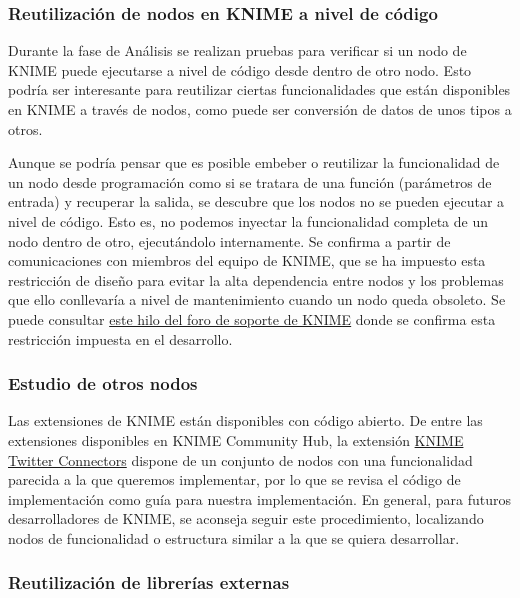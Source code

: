 \subsubsection{Reutilización de nodos en KNIME a nivel de código}

Durante la fase de Análisis se realizan pruebas para verificar si un nodo de KNIME puede ejecutarse a nivel de código desde 
dentro de otro nodo. Esto podría ser interesante para reutilizar ciertas funcionalidades que están disponibles en KNIME 
a través de nodos, como puede ser conversión de datos de unos tipos a otros. 
\

Aunque se podría pensar que es posible embeber o reutilizar la funcionalidad de un nodo desde programación como si 
se tratara de una función (parámetros de entrada) y recuperar la salida, se descubre que los nodos no se pueden ejecutar a nivel de código. Esto es, no podemos inyectar la funcionalidad completa de un nodo 
dentro de otro, ejecutándolo internamente. Se confirma a partir de comunicaciones con miembros del equipo de KNIME, que se ha 
impuesto esta restricción de diseño para evitar la alta dependencia entre nodos y los problemas que ello conllevaría a nivel 
de mantenimiento cuando un nodo queda obsoleto. Se puede consultar \href{https://forum.knime.com/t/using-node-without-gui/2044/8}{este hilo del foro de soporte de KNIME} donde se confirma esta restricción impuesta en el desarrollo. 
\

\subsubsection{Estudio de otros nodos}

Las extensiones de KNIME están disponibles con código abierto. De entre las extensiones disponibles en KNIME Community Hub, la extensión 
\href{https://hub.knime.com/knime/extensions/org.knime.features.ext.twitter/latest}{KNIME Twitter Connectors} dispone de un 
conjunto de nodos con una funcionalidad parecida a la que queremos implementar, por lo que se revisa el código de implementación
como guía para nuestra implementación. En general, para futuros desarrolladores de KNIME, se aconseja seguir este procedimiento, 
localizando nodos de funcionalidad o estructura similar a la que se quiera desarrollar. 

\subsubsection{Reutilización de librerías externas}


